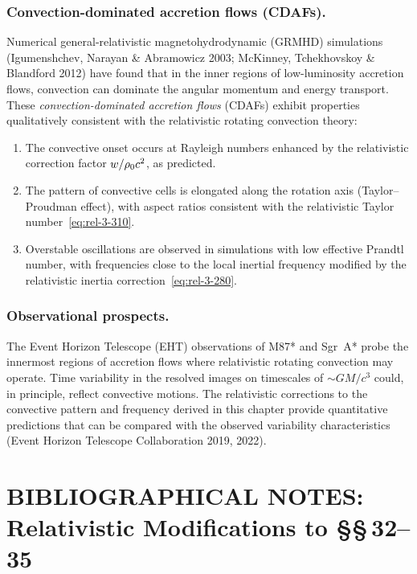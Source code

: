 \subsubsection*{Convection-dominated accretion flows (CDAFs).}
Numerical general-relativistic magnetohydrodynamic (GRMHD) simulations
(Igumenshchev, Narayan \& Abramowicz 2003; McKinney, Tchekhovskoy \&
Blandford 2012) have found that in the inner regions of low-luminosity
accretion flows, convection can dominate the angular momentum and
energy transport.  These \emph{convection-dominated accretion flows}
(CDAFs) exhibit properties qualitatively consistent with the
relativistic rotating convection theory:
\begin{enumerate}
  \item The convective onset occurs at Rayleigh numbers enhanced by
    the relativistic correction factor $w / \rho_0 c^2$,
    as predicted.
  \item The pattern of convective cells is elongated along the rotation
    axis (Taylor--Proudman effect), with aspect ratios consistent with
    the relativistic Taylor number~\eqref{eq:rel-3-310}.
  \item Overstable oscillations are observed in simulations with
    low effective Prandtl number, with frequencies close to the
    local inertial frequency modified by the relativistic inertia
    correction~\eqref{eq:rel-3-280}.
\end{enumerate}

\subsubsection*{Observational prospects.}
The Event Horizon Telescope (EHT) observations of M87* and Sgr~A*
probe the innermost regions of accretion flows where relativistic
rotating convection may operate.  Time variability in the resolved
images on timescales of $\sim GM/c^3$ could, in principle, reflect
convective motions.  The relativistic corrections to the convective
pattern and frequency derived in this chapter provide quantitative
predictions that can be compared with the observed variability
characteristics (Event Horizon Telescope Collaboration 2019, 2022).


\section*{BIBLIOGRAPHICAL NOTES: Relativistic Modifications to \S\S\,32--35}


